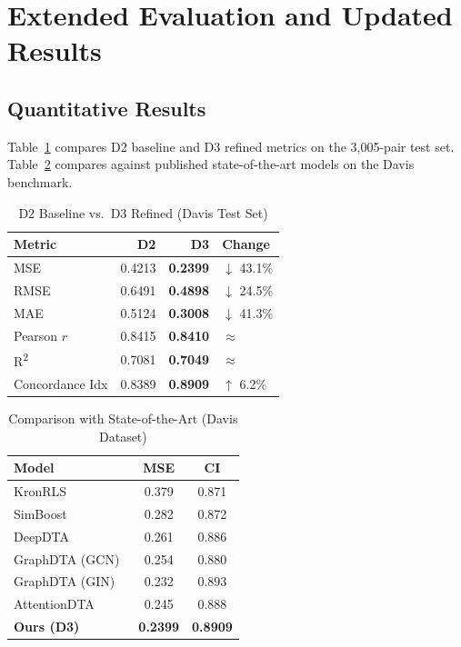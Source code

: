 \documentclass[conference]{IEEEtran}
\begin{document}
\section{Extended Evaluation and Updated Results}

\subsection{Quantitative Results}

Table~\ref{tab:d2d3} compares D2 baseline and D3 refined metrics on the
3,005-pair test set. Table~\ref{tab:sota} compares against published
state-of-the-art models on the Davis benchmark.

\begin{table}[h]
\centering
\caption{D2 Baseline vs.\ D3 Refined (Davis Test Set)}
\label{tab:d2d3}
\begin{tabular}{lrrl}
\toprule
\textbf{Metric} & \textbf{D2} & \textbf{D3} & \textbf{Change} \\
\midrule
MSE              & 0.4213 & \textbf{0.2399} & $\downarrow$ 43.1\% \\
RMSE             & 0.6491 & \textbf{0.4898} & $\downarrow$ 24.5\% \\
MAE              & 0.5124 & \textbf{0.3008} & $\downarrow$ 41.3\% \\
Pearson $r$      & 0.8415 & \textbf{0.8410} & $\approx$            \\
R\textsuperscript{2} & 0.7081 & \textbf{0.7049} & $\approx$        \\
Concordance Idx  & 0.8389 & \textbf{0.8909} & $\uparrow$ 6.2\%    \\
\bottomrule
\end{tabular}
\end{table}

\begin{table}[h]
\centering
\caption{Comparison with State-of-the-Art (Davis Dataset)}
\label{tab:sota}
\begin{tabular}{lcc}
\toprule
\textbf{Model} & \textbf{MSE} & \textbf{CI} \\
\midrule
KronRLS~\cite{pahikkala2015}        & 0.379 & 0.871 \\
SimBoost~\cite{he2017}              & 0.282 & 0.872 \\
DeepDTA~\cite{ozturk2018}           & 0.261 & 0.886 \\
GraphDTA (GCN)~\cite{nguyen2021}    & 0.254 & 0.880 \\
GraphDTA (GIN)~\cite{nguyen2021}    & 0.232 & 0.893 \\
AttentionDTA~\cite{zhao2019}        & 0.245 & 0.888 \\
\midrule
\textbf{Ours (D3)}                  & \textbf{0.2399} & \textbf{0.8909} \\
\bottomrule
\end{tabular}
\end{table}
\end{document}

